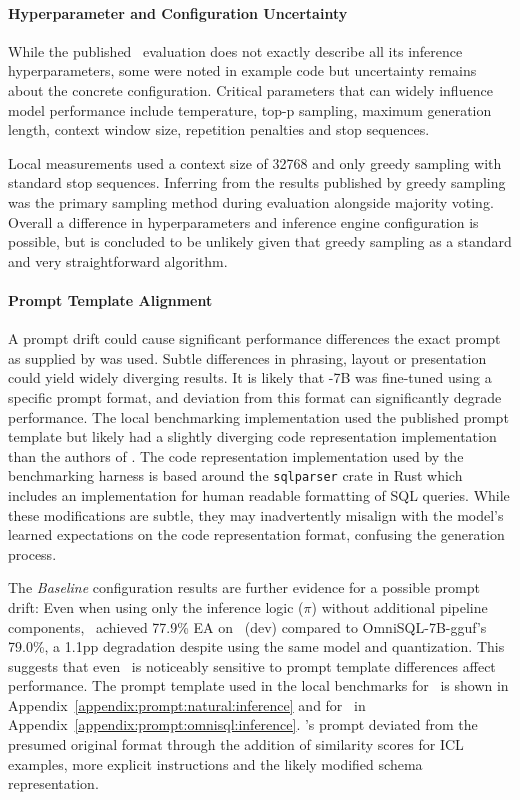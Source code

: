 \paragraph{Hyperparameter and Configuration Uncertainty}

While the published \OmniSQL~evaluation does not exactly describe all its
inference hyperparameters, some were noted in example code but uncertainty
remains about the concrete configuration. Critical parameters that can widely
influence model performance include temperature, top-p sampling, maximum
generation length, context window size, repetition penalties and stop sequences.

Local measurements used a context size of 32768 and only greedy sampling with
standard stop sequences. Inferring from the results published by
\citeauthor{OmniSQL} greedy sampling was the primary sampling method during
evaluation alongside majority voting. Overall a difference in hyperparameters
and inference engine configuration is possible, but is concluded to be unlikely
given that greedy sampling as a standard and very straightforward algorithm.

\paragraph{Prompt Template Alignment}

A prompt drift could cause significant performance differences the exact prompt
as supplied by \citeauthor{OmniSQL} was used. Subtle differences in phrasing,
layout or presentation could yield widely diverging results. It is
likely that \OmniSQL-7B was fine-tuned using a specific prompt format, and
deviation from this format can significantly degrade performance. The local
benchmarking implementation used the published prompt template but likely had a
slightly diverging code representation implementation than the authors of
\OmniSQL. The code representation implementation used by the benchmarking
harness is based around the \texttt{sqlparser} crate in Rust which includes an
implementation for human readable formatting of SQL queries. While these
modifications are subtle, they may inadvertently misalign with the model's
learned expectations on the code representation format, confusing the
generation process.

The \textit{Baseline} configuration results are further evidence for a possible
prompt drift: Even when using only the inference logic ($\pi$) without
additional pipeline components, \Natural~achieved 77.9\% EA on \Spider~(dev)
compared to OmniSQL-7B-gguf's 79.0\%, a 1.1pp degradation despite using the
same model and quantization. This suggests that even \OmniSQL~is noticeably
sensitive to prompt template differences affect performance. The prompt
template used in the local benchmarks for \Natural~is shown in
Appendix~\ref{appendix:prompt:natural:inference} and for \OmniSQL~in
Appendix~\ref{appendix:prompt:omnisql:inference}. \Natural's prompt deviated
from the presumed original format through the addition of similarity scores for
ICL examples, more explicit instructions and the likely modified schema
representation.

